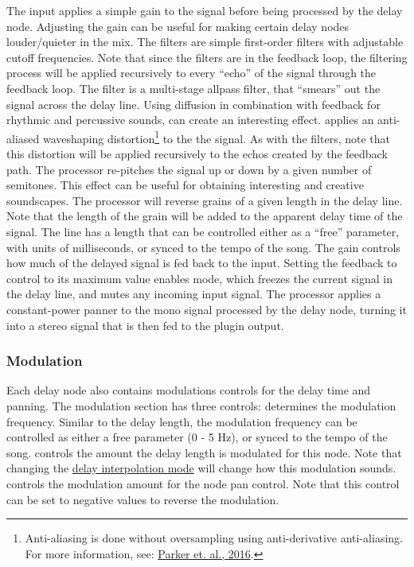 \documentclass[landscape,twocolumn,a5paper]{manual}
\begin{document}
%
The input  applies a simple gain
to the signal before being processed by the delay
node. Adjusting the gain can be useful for making
certain delay nodes louder/quieter in the mix.
\newline
The  filters are simple
first-order filters with adjustable cutoff frequencies.
Note that since the filters are in the feedback loop,
the filtering process will be applied recursively to every
``echo'' of the signal through the feedback loop.
\newpar
The  filter is a multi-stage allpass
filter, that ``smears'' out the signal across the delay line.
Using diffusion in combination with feedback for rhythmic
and percussive sounds, can create an interesting effect.
\newpar
{} applies an anti-aliased waveshaping
distortion\footnote{Anti-aliasing is done without oversampling using anti-derivative anti-aliasing. For more information, see: \href{http://dafx16.vutbr.cz/dafxpapers/20-DAFx-16_paper_41-PN.pdf}{Parker et. al., 2016}.}
to the the signal. As with the filters, note that this
distortion will be applied recursively to the echos created
by the feedback path.
\newpar
The  processor re-pitches the signal up
or down by a given number of semitones. This effect can be
useful for obtaining interesting and creative soundscapes.
\newline
The  processor will reverse grains of
a given length in the delay line. Note that the length
of the grain will be added to the apparent delay time
of the signal.
\newpar
The  line has a length that can be
controlled either as a ``free'' parameter, with units
of milliseconds, or synced to the tempo of the song.
\newpar
The  gain controls how much of the
delayed signal is fed back to the input.
Setting the feedback to control to its maximum value
enables  mode, which freezes the
current signal in the delay line, and mutes any incoming
input signal.
\newpar
The  processor applies a constant-power
panner to the mono signal processed by the delay node,
turning it into a stereo signal that is then fed to the
plugin output.
\newline\newline\newline

\subsubsection{Modulation}
Each delay node also contains modulations controls for the
delay time and panning. The modulation section has three
controls:
\newpar
{} determines the modulation frequency.
Similar to the delay length, the modulation frequency can
be controlled as either a free parameter (0 - 5 Hz), or
synced to the tempo of the song.
\newpar
{} controls the amount the delay length
is modulated for this node. Note that changing the
\hyperlink{goto:interp-mode}{delay interpolation mode}
will change how this modulation sounds.
\newpar
{} controls the modulation amount for
the node pan control. Note that this control can be
set to negative values to reverse the modulation.
\end{document}
